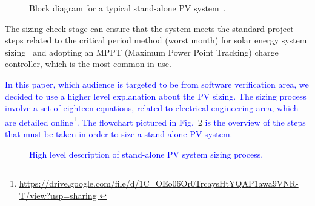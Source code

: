 \documentclass[runningheads]{llncs}
\begin{document}
\begin{figure}[h]
\centering
\caption{Block diagram for a typical stand-alone PV system~\cite{Hansen}.}
\label{fig:blockdiagram} 
\end{figure}

The sizing check stage can ensure that the system meets the standard project steps related to the critical period method (worst month) for solar energy system sizing~\cite{Pinho} and adopting an MPPT (Maximum Power Point Tracking) charge controller, which is the most common in use. 

\textcolor{blue}{In this paper, which audience is targeted to be from software verification area, we decided to use a higher level explanation about the PV sizing. The sizing process involve a set of eighteen equations, related to electrical engineering area, which are detailed online\footnote{\url{https://drive.google.com/file/d/1C\_OEo06Or0TrcaysHtYQAP1awa9VNR-T/view?usp=sharing }}. The flowchart pictured in Fig.~\ref{fig:flow}  is the overview of the steps that must be taken in order to size a stand-alone PV system.}

\begin{figure}[h]
\centering
\caption{\textcolor{blue}{High level description of stand-alone PV system sizing process.}}
\label{fig:flow} 
\end{figure}
\end{document}
